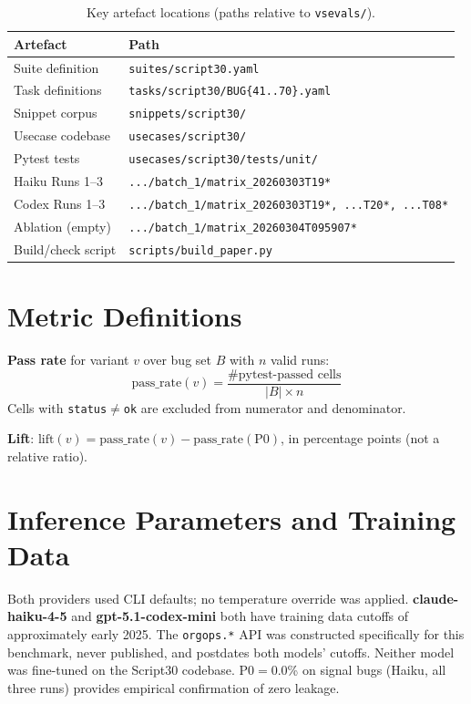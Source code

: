 \documentclass[10pt,conference]{IEEEtran}
\begin{document}
\begin{table}[t]
\centering
\caption{Key artefact locations (paths relative to \texttt{vsevals/}).}
\label{tab:artefacts}
\footnotesize
\begin{tabular}{@{}ll@{}}
\toprule
\textbf{Artefact} & \textbf{Path} \\
\midrule
Suite definition     & \texttt{suites/script30.yaml} \\
Task definitions     & \texttt{tasks/script30/BUG\{41..70\}.yaml} \\
Snippet corpus       & \texttt{snippets/script30/} \\
Usecase codebase     & \texttt{usecases/script30/} \\
Pytest tests         & \texttt{usecases/script30/tests/unit/} \\
Haiku Runs 1--3      & \texttt{.../batch\_1/matrix\_20260303T19*} \\
Codex Runs 1--3      & \texttt{.../batch\_1/matrix\_20260303T19*, ...T20*, ...T08*} \\
Ablation (empty)     & \texttt{.../batch\_1/matrix\_20260304T095907*} \\
Build/check script   & \texttt{scripts/build\_paper.py} \\
\bottomrule
\end{tabular}
\end{table}

\section{Metric Definitions}
\label{app:metrics}

\textbf{Pass rate} for variant $v$ over bug set $B$ with $n$ valid runs:
\[
  \text{pass\_rate}(v) = \frac{\text{\# pytest-passed cells}}{\lvert B \rvert \times n}
\]
Cells with \texttt{status$\neq$ok} are excluded from numerator and denominator.

\textbf{Lift}: $\text{lift}(v) = \text{pass\_rate}(v) - \text{pass\_rate}(\text{P0})$, in percentage points (not a relative ratio).

\section{Inference Parameters and Training Data}
\label{app:model-details}

Both providers used CLI defaults; no temperature override was applied.
\textbf{claude-haiku-4-5} and \textbf{gpt-5.1-codex-mini} both have training data cutoffs of approximately early 2025.
The \texttt{orgops.*} API was constructed specifically for this benchmark, never published, and postdates both models' cutoffs.
Neither model was fine-tuned on the Script30 codebase.
P0$=$0.0\% on signal bugs (Haiku, all three runs) provides empirical confirmation of zero leakage.
\end{document}
